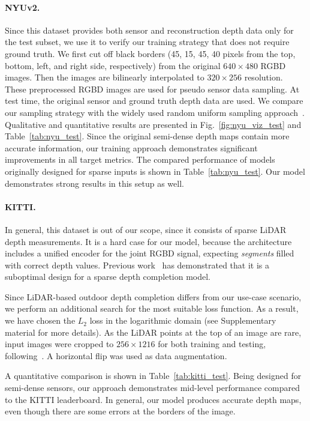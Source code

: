 \documentclass[final]{cvpr}
\begin{document}
    \paragraph{NYUv2.} Since this dataset provides both sensor and reconstruction depth data only for the test subset, we use it to verify our training strategy that does not require ground truth. We first cut off black borders (45, 15, 45, 40 pixels from the top, bottom, left, and right side, respectively) from the original $640 \times 480$ RGBD images. Then the images are bilinearly interpolated to $320 \times 256$ resolution. These preprocessed RGBD images are used for pseudo sensor data sampling. At test time, the original sensor and ground truth depth data are used. We compare our sampling strategy with the widely used random uniform sampling approach~\cite{Ma2017SparseToDense, guidenet}. Qualitative and quantitative results are presented in Fig.~\ref{fig:nyu_viz_test} and Table~\ref{tab:nyu_test}. Since the original semi-dense depth maps contain more accurate information, our training approach demonstrates significant improvements in all target metrics. The compared performance of models originally designed for sparse inputs is shown in Table~\ref{tab:nyu_test}. Our model demonstrates strong results in this setup as well.


    \paragraph{KITTI.} In general, this dataset is out of our scope, since it consists of sparse LiDAR depth measurements. It is a hard case for our model, because the architecture includes a unified encoder for the joint RGBD signal, expecting \textit{segments} filled with correct depth values. Previous work~\cite{msg_chn} has demonstrated that it is a suboptimal design for a sparse depth completion model.  
    
    Since LiDAR-based outdoor depth completion differs from our use-case scenario, we perform an additional search for the most suitable loss function. As a result, we have chosen the $L_2$ loss in the logarithmic domain (see Supplementary material for more details). 
As the LiDAR points at the top of an image are rare, input images were cropped to $256\times 1216$ for both training and testing, following~\cite{guidenet}. A horizontal flip was used as data augmentation.
    
    A quantitative comparison is shown in Table~\ref{tab:kitti_test}. Being designed for semi-dense sensors, our approach demonstrates mid-level performance compared to the KITTI leaderboard. In general, our model produces accurate depth maps, even though there are some errors at the borders of the image.
    
\end{document}
